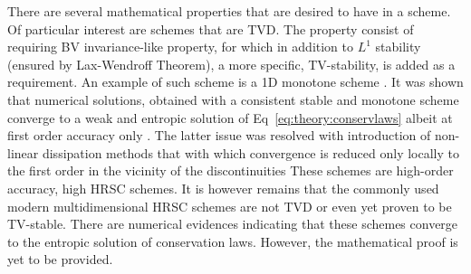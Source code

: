 There are several mathematical properties that are desired to have in a scheme.
Of particular interest are schemes that are \ac{TVD}. 
The property consist of requiring \ac{BV} invariance-like property, 
for which in addition to $L^1$ stability (ensured by Lax-Wendroff Theorem),
a more specific, \ac{TV}-stability, is added as a requirement. 
An example of such scheme is a 1D monotone scheme \citep{LeVeque:1992}.
It was shown that numerical solutions, obtained with a consistent stable and 
monotone scheme converge to a weak and entropic solution of Eq~\eqref{eq:theory:conservlaws}
\citep{Crandall:1980} albeit at first order accuracy only \citep{Harten:1976}.
The latter issue was resolved with introduction of non-linear dissipation methods that with which convergence is reduced only locally to the first order in the vicinity of the discontinuities
These schemes are high-order accuracy, high \ac{HRSC} schemes.
It is however remains that the commonly used modern multidimensional \ac{HRSC} schemes are not \ac{TVD} or even yet proven to be TV-stable. There are numerical evidences indicating
that these schemes converge to the entropic solution of conservation laws. However, the mathematical proof is yet to be provided. 


